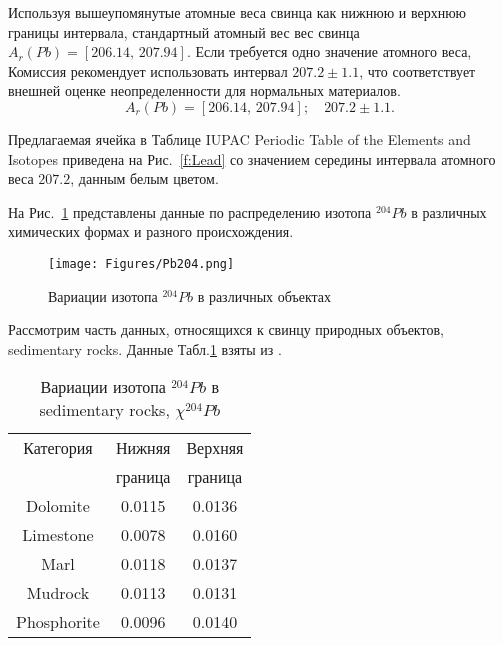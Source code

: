\documentclass[a5paper,openany]{book}
\begin{document}
Используя вышеупомянутые атомные веса свинца как нижнюю и верхнюю границы интервала, стандартный атомный вес вес свинца $A_r(Pb) = [206.14,\, 207.94]$. Если требуется одно значение атомного веса, Комиссия рекомендует
использовать интервал $207.2 \pm 1.1$, что соответствует внешней оценке неопределенности
для нормальных материалов.
\begin{equation}
A_r(Pb) = [206.14, \, 207.94]; \quad 207.2 \pm 1.1.
\end{equation}

Предлагаемая ячейка в Таблице IUPAC Periodic Table of the Elements and Isotopes \cite{IPTEI} приведена на Рис.~\ref{f:Lead} со значением середины интервала атомного веса $207.2$, данным белым цветом. 


На Рис.~\ref{f:204LeadVariation} представлены данные по распределению изотопа $^{204}Pb$ в различных химических формах и разного происхождения.
\begin{figure}[ht] 
	\centering\small
	\texttt{[image: Figures/Pb204.png]}
	\caption{Вариации изотопа $^{204}Pb$ в различных объектах} 
	\label{f:204LeadVariation}
\end{figure}

Рассмотрим часть данных, относящихся к свинцу природных объектов, sedimentary rocks. Данные Табл.\ref{t:204LeadVariation} взяты из \cite{IUPACLead}.
\begin{table}[h!]
	\begin{center}
		{\small
			\begin{tabular}{ccc}
				\hline
				Категория & Нижняя & Верхняя \\
				~ & граница & граница \\ 
				\hline
				Dolomite	& 0.0115 & 0.0136 \\
				Limestone	& 0.0078 & 0.0160 \\
				Marl 	& 0.0118 & 0.0137 \\
				Mudrock 	& 0.0113 & 0.0131 \\
				Phosphorite & 0.0096 & 0.0140 \\
				\hline
			\end{tabular}
		}
		\caption{Вариации изотопа $^{204}Pb$ в sedimentary rocks,  $ \chi ^{204}Pb$}
		\label{t:204LeadVariation}
	\end{center}
\end{table}
\end{document}
